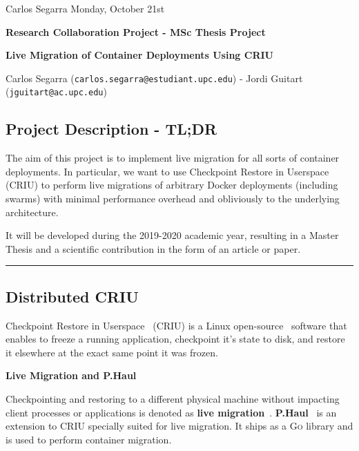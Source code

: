 \documentclass[a4paper, 10pt]{article}
\begin{document}
Carlos Segarra \hfill Monday, October 21st

\vspace{15pt}

\begin{center}
    \textbf{Research Collaboration Project - MSc Thesis Project}

    \vspace{10pt}

    \textbf{\Large Live Migration of Container Deployments Using CRIU}

    \vspace{10pt}

    \small{Carlos Segarra (\texttt{carlos.segarra@estudiant.upc.edu}) - Jordi Guitart (\texttt{jguitart@ac.upc.edu})}
\end{center}

\vspace{10pt}

\subsection*{Project Description - TL;DR}

The aim of this project is to implement live migration for all sorts of container deployments.
In particular, we want to use Checkpoint Restore in Userspace (CRIU) to perform live migrations of arbitrary Docker deployments (including swarms) with minimal performance overhead and obliviously to the underlying architecture.

It will be developed during the 2019-2020 academic year, resulting in a Master Thesis and a scientific contribution in the form of an article or paper.

\vspace{10pt}

\hrule


\subsection*{Distributed CRIU}
Checkpoint Restore in Userspace~\cite{criu-wiki} (CRIU) is a Linux open-source~\cite{criu-github} software that enables to freeze a running application, checkpoint it's state to disk, and restore it elsewhere at the exact same point it was frozen.

\textbf{Live Migration and P.Haul}

Checkpointing and restoring to a different physical machine without impacting client processes or applications is denoted as \textbf{live migration}~\cite{live-migration-criu}.
\textbf{P.Haul}~\cite{phaul-criu,phaul-github} is an extension to CRIU specially suited for live migration.
It ships as a \textsc{Go} library and is used to perform container migration.
\end{document}
